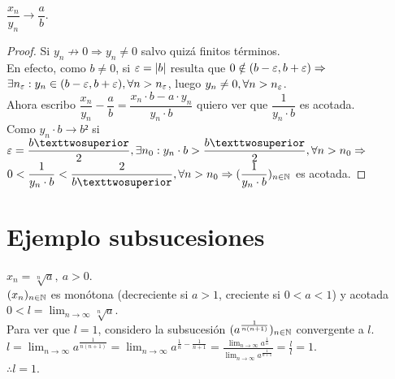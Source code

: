 \begin{prop}
  $\dfrac{x_n}{y_n} \to \dfrac{a}{b}$.
  \begin{proof}
    Si $y_n \not \to 0 \Rightarrow y_n \neq 0$ salvo quizá finitos términos. \\
    En efecto, como $b \neq 0$, si $\varepsilon = |b|$ resulta que $0 \notin (b - \varepsilon, b + \varepsilon) \Rightarrow$ \\
    $\exists n_{\varepsilon} : y_n \in (b-\varepsilon, b+\varepsilon), \forall n > n_{\varepsilon}$, luego $y_n \neq 0, \forall n > n_{\varepsilon}$. \\

    Ahora escribo $\dfrac{x_n}{y_n} - \dfrac{a}{b} = \dfrac{x_n \cdot b - a \cdot y_n}{y_n \cdot b}$ quiero ver que $\dfrac{1}{y_n \cdot b}$ es acotada. \\
    Como $y_n \cdot b \to b²$ si $\e = \dfrac{b²}{2}, \exists n_0 : y_n \cdot b > \dfrac{b²}{2}, \forall n > n_0 \Rightarrow$ \\
    $0 < \dfrac{1}{y_n \cdot b} < \dfrac{2}{b²}, \forall n > n_0 \Rightarrow (\dfrac{1}{y_n \cdot b})_{n \in \N}$ es acotada.
  \end{proof}
\end{prop}

\section{Ejemplo subsucesiones}

\begin{eg}
  $x_n = \sqrt[n]{a}, \ a > 0$. \\
  $(x_n)_{n \in \mathbb{N}}$ es monótona (decreciente si $a > 1$, creciente si $0 < a < 1$) y acotada $0 < l = \lim_{n \to \infty} \sqrt[n]{a}$. \\
  Para ver que $l = 1$, considero la subsucesión $(a^{\frac{1}{n(n+1)}})_{n \in \mathbb{N}}$ convergente a $l$. \\
  $l = \lim_{n \to \infty} a^{\frac{1}{n(n+1)}} = \lim_{n \to \infty} a^{\frac{1}{n} - \frac{1}{n+1}} =
    \frac{\lim_{n \to \infty} a^{\frac{1}{n}}}{\lim_{n \to \infty} a^{\frac{1}{n+1}}} = \frac{l}{l} = 1.$ \\
  $\therefore l = 1$.
\end{eg}

